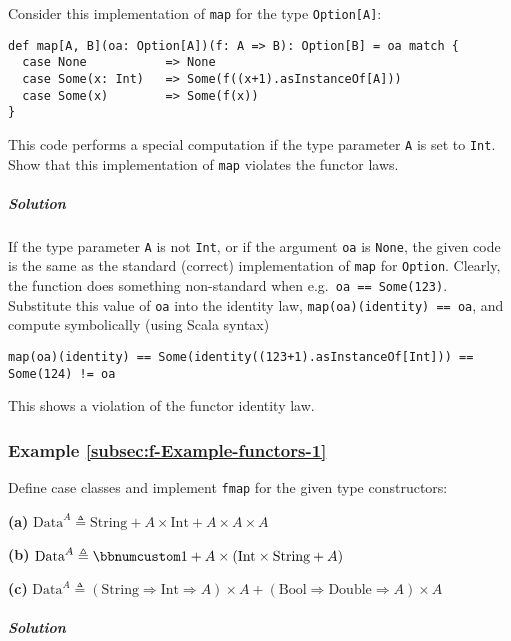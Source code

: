 Consider this implementation of \lstinline!map! for the type \lstinline!Option[A]!:
\begin{lstlisting}
def map[A, B](oa: Option[A])(f: A => B): Option[B] = oa match {
  case None           => None
  case Some(x: Int)   => Some(f((x+1).asInstanceOf[A]))
  case Some(x)        => Some(f(x))
}
\end{lstlisting}
This code performs a special computation if the type parameter \lstinline!A!
is set to \lstinline!Int!. Show that this implementation of \lstinline!map!
violates the functor laws.

\subparagraph{Solution}

If the type parameter \lstinline!A! is not \lstinline!Int!, or if
the argument \lstinline!oa! is \lstinline!None!, the given code
is the same as the standard (correct) implementation of \lstinline!map!
for \lstinline!Option!. Clearly, the function does something non-standard
when e.g.~\lstinline!oa == Some(123)!. Substitute this value of
\lstinline!oa! into the identity law, \lstinline!map(oa)(identity) == oa!,
and compute symbolically (using Scala syntax)
\begin{lstlisting}
map(oa)(identity) == Some(identity((123+1).asInstanceOf[Int])) == Some(124) != oa
\end{lstlisting}
This shows a violation of the functor identity law.

\subsubsection{Example \label{subsec:f-Example-functors-1}\ref{subsec:f-Example-functors-1}}

Define case classes and implement \lstinline!fmap! for the given
type constructors:

\textbf{(a)} $\text{Data}^{A}\triangleq\text{String}+A\times\text{Int}+A\times A\times A$

\textbf{(b)} $\text{Data}^{A}\triangleq\bbnum 1+A\times(\text{Int}\times\text{String}+A)$ 

\textbf{(c)} $\text{Data}^{A}\triangleq(\text{String}\Rightarrow\text{Int}\Rightarrow A)\times A+(\text{Bool}\Rightarrow\text{Double}\Rightarrow A)\times A$

\subparagraph{Solution}

